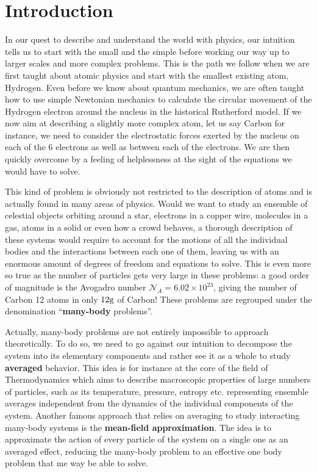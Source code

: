 \chapter*{Introduction}

\label{chap:intro}





In our quest to describe and understand the world with physics, our intuition tells us to start with the small and the simple before working our way up to larger scales and more complex problems. This is the path we follow when we are first taught about atomic physics and start with the smallest existing atom, Hydrogen. Even before we know about quantum mechanics, we are often taught how to use simple Newtonian mechanics to calculate the circular movement of the Hydrogen electron around the nucleus in the historical Rutherford model. If we now aim at describing a slightly more complex atom, let us say Carbon for instance, we need to consider the electrostatic forces exerted by the nucleus on each of the 6 electrons as well as between each of the electrons. We are then quickly overcome by a feeling of helplessness at the sight of the equations we would have to solve.


This kind of problem is obviously not restricted to the description of atoms and is actually found in many areas of physics. Would we want to study an ensemble of celestial objects orbiting around a star, electrons in a copper wire, molecules in a gas, atoms in a solid or even how a crowd behaves, a thorough description of these systems would require to account for the motions of all the individual bodies and the interactions between each one of them, leaving us with an enormous amount of degrees of freedom and equations to solve. This is even more so true as the number of particles gets very large in these problems: a good order of magnitude is the Avogadro number $\mathcal{N}_A = 6.02 \times 10^{23}$, giving the number of Carbon 12 atoms in only $12\rm{g}$ of Carbon! These problems are regrouped under the denomination ``\textbf{many-body} problems''. 


Actually, many-body problems are not entirely impossible to approach theoretically. To do so, we need to go against our intuition to decompose the system into its elementary components and rather see it as a whole to study \textbf{averaged} behavior. This idea is for instance at the core of the field of Thermodynamics which aims to describe macroscopic properties of large numbers of particles, such as its temperature, pressure, entropy etc. representing ensemble averages independent from the dynamics of the individual components of the system. Another famous approach that relies on averaging to study interacting many-body systems is the \textbf{mean-field approximation}. The idea is to approximate the action of every particle of the system on a single one as an averaged effect, reducing the many-body problem to an effective one body problem that me way be able to solve.


